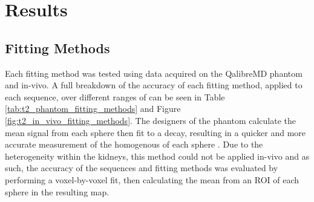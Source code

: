 \newpage

\section{Results}

\subsection{Fitting Methods}

Each fitting method was tested using data acquired on the QalibreMD phantom and in-vivo. A full breakdown of the accuracy of each fitting method, applied to each sequence, over different ranges of \ttwo can be seen in Table \ref{tab:t2_phantom_fitting_methods} and Figure \ref{fig:t2_in_vivo_fitting_methods}. The designers of the phantom calculate the mean signal from each sphere then fit to a \ttwo decay, resulting in a quicker and more accurate measurement of the homogenous \ttwo of each sphere \cite{mristandards_mristandardsphantomviewer_2020}. Due to the heterogeneity within the kidneys, this method could not be applied in-vivo and as such, the accuracy of the sequences and fitting methods was evaluated by performing a voxel-by-voxel fit, then calculating the mean \ttwo from an \ac{ROI} of each sphere in the resulting map.

